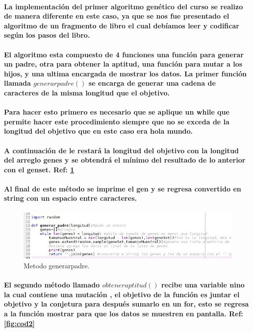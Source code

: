 \documentclass[10pt,a4paper]{article}
\begin{document}
\paragraph{
La implementaci\'on del primer algoritmo gen\'etico del curso se realizo de manera diferente en este caso, ya que se nos fue presentado el algoritmo de un fragmento de libro el cual deb\'iamos leer y codificar seg\'un los pasos del libro. 
}
\paragraph{
El algoritmo esta compuesto de 4 funciones una funci\'on para generar un padre, otra para obtener la aptitud, una funci\'on para mutar a los hijos, y una ultima encargada de mostrar los datos.
La primer funci\'on llamada $generarpadre()$ se encarga de generar una cadena de caracteres de la misma longitud que el objetivo.
}
\paragraph{Para hacer esto primero es necesario que se aplique un while que permite hacer este procedimiento siempre que no se exceda de la longitud del objetivo que en este caso era hola mundo.
}
\paragraph{
A continuaci\'on de le restar\'a la longitud del objetivo con la longitud del arreglo genes y se obtendr\'a el m\'inimo del resultado de lo anterior con el genset. Ref: \ref{fig:cod1}
}
\paragraph{
Al final de este m\'etodo se imprime el gen y se regresa convertido en string con un espacio entre caracteres.}

\begin{figure}[H]
\includegraphics[scale=0.7] {img1.jpg}
\caption{Metodo generarpadre.}
\label{fig:cod1}
\end{figure}

\paragraph{
El segundo m\'etodo llamado $obteneraptitud()$ recibe una variable nino la cual contiene una mutaci\'on , el objetivo de la funci\'on es juntar el objetivo y la conjetura para despu\'es sumarlo en un for, esto se regresa a la funci\'on mostrar para que los datos se muestren en pantalla. Ref: \ref{fig:cod2}
}
\end{document}

